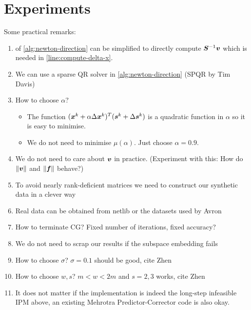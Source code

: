 \chapter{Experiments} \label{chap:experiments}

Some practical remarks:
\begin{enumerate}
  \item {} of \cref{alg:newton-direction} can be simplified to directly compute \(\bm{S}^{-1}\bm{v}\) which is needed in \cref{line:compute-delta-x}.
  \item We can use a sparse QR solver in \cref{alg:newton-direction} (SPQR by Tim Davis)
  \item How to choose \(\alpha\)?
  \begin{itemize}
    \item The function \((\bm{x}^k + \alpha \Delta\bm{x}^k)^T (\bm{s}^k + \Delta\bm{s}^k)\) is a quadratic function in \(\alpha\) so it is easy to minimise.
    \item We do not need to minimise \(\mu(\alpha)\). Just choose \(\alpha = 0.9\).
  \end{itemize}
  \item We do not need to care about \(\bm{v}\) in practice. (Experiment with this: How do \(\lVert \bm{v} \rVert\) and \(\lVert \bm{f} \rVert\) behave?)
  \item To avoid nearly rank-deficient matrices we need to construct our synthetic data in a clever way
  \item Real data can be obtained from netlib or the datasets used by Avron
  \item How to terminate CG? Fixed number of iterations, fixed accuracy?
  \item We do not need to scrap our results if the subspace embedding fails
  \item How to choose \(\sigma\)? \(\sigma = 0.1\) should be good, cite Zhen
  \item How to choose \(w, s\)? \(m < w < 2m\) and \(s = 2, 3\) works, cite Zhen
  \item It does not matter if the implementation is indeed the long-step infeasible IPM above, an existing Mehrotra Predictor-Corrector code is also okay.
\end{enumerate}
